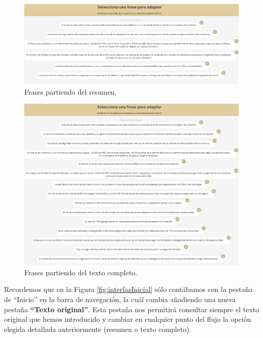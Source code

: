 \begin{itemize}
\begin{figure}[h!]
 	 	 	
 	 	 	\includegraphics[scale=0.45]{Imagenes/Figuras/Resumen}
 	 	 	
 	 	 	
 	 	 	\caption{Frases partiendo del resumen.}
 	 	 	\label{fig:interfazFraseTextoResumido}
 	 	 \end{figure}
 	 	 
 	 	 
 	 	 \begin{figure}[h!]
 	 	 	\centering
 	 	 	
 	 	 	
 	 	 	\includegraphics[scale=0.68]{Imagenes/Figuras/TextoCompleto}
 	 	 	
 	 	 	
 	 	 	\caption{Frases partiendo del texto completo.}
 	 	 	\label{fig:interfazIntroducirCompleto}
 	 	 \end{figure}	
 \end{itemize}

	Recordemos que en la Figura \ref{fig:interfazInicial} sólo contábamos con la pestaña de ``Inicio'' en la barra de navegación, la cuál cambia añadiendo una nueva pestaña \textbf{``Texto original''}. Esta pestaña nos permitirá consultar siempre el texto original que hemos introducido y cambiar en cualquier punto del flujo la opción elegida detallada anteriormente (resumen o texto completo). 


